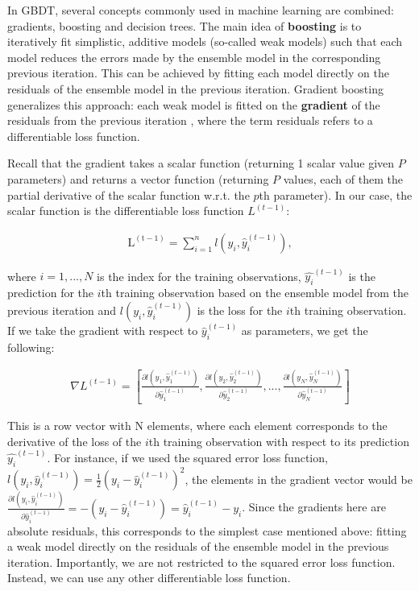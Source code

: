 \documentclass{article}
\begin{document}
	In GBDT, several concepts commonly used in machine learning are combined: gradients, boosting and decision trees. The main idea of \textbf{boosting} is to iteratively fit simplistic, additive models (so-called weak models) such that each model reduces the errors made by the ensemble model in the corresponding previous iteration. This can be achieved by fitting each model directly on the residuals of the ensemble model in the previous iteration. Gradient boosting generalizes this approach: each weak model is fitted on the \textbf{gradient} of the residuals from the previous iteration  \cite{chen_xgboost:_2016} \cite{friedman_greedy_2001}  \cite{noauthor_kaggle_nodate}, where the term residuals refers to a differentiable loss function.
	
	Recall that the gradient takes a scalar function (returning 1 scalar value given $P$ parameters) and returns a vector function (returning $P$ values, each of them the partial derivative of the scalar function w.r.t. the $p$th parameter). In our case, the scalar function is the differentiable loss function $L^{(t-1)}$:

	\begin{align}
	\mathrm{L^{(t-1)}} = \sum_{i=1}^n l(y_i, \hat{y}_i^{(t-1)}), 
	\end{align} 
	
	where $i = 1, ..., N$ is the index for the training observations, $\hat{y_i}^{(t-1)}$ is the prediction for the $i$th training observation based on the ensemble model from the previous iteration and $l(y_i, \hat{y}_i^{(t-1)})$ is the loss for the $i$th training observation. If we take the gradient with respect to $\hat{y}_i^{(t-1)}$ as parameters, we get the following:
	
	\begin{align}
		\nabla L^{(t-1)} = \left[\frac{\partial l(y_1, \hat{y}_1^{(t-1)})}{\partial \hat{y}_1^{(t-1)}}, \frac{\partial l(y_2, \hat{y}_2^{(t-1)})}{\partial \hat{y}_2^{(t-1)}}, ..., \frac{\partial l(y_N, \hat{y}_N^{(t-1)})}{\partial \hat{y}_N^{(t-1)}}\right]
	\end{align}
	
	This is a row vector with N elements, where each element corresponds to the derivative of the loss of the $i$th training observation with respect to its prediction $\hat{y_i}^{(t-1)}$. For instance, if we used the squared error loss function, $l(y_i, \hat{y}_i^{(t-1)}) = \frac{1}{2} \left(y_i - \hat{y}_i^{(t-1)}\right)^2$, the elements in the gradient vector would be $\frac{\partial l(y_i, \hat{y}_i^{(t-1)})}{\partial \hat{y}_i^{(t-1)}} = -\left(y_i - \hat{y}_i^{(t-1)}\right) = \hat{y}_i^{(t-1)} - y_i$. Since the gradients here are absolute residuals, this corresponds to the simplest case mentioned above: fitting a weak model directly on the residuals of the ensemble model in the previous iteration. Importantly, we are not restricted to the squared error loss function. Instead, we can use any other differentiable loss function.
	
\end{document}

